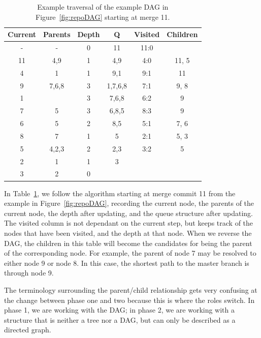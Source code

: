 \documentclass[draft]{IEEEtran}
\begin{document}
\begin{table}[htpb]
  \centering
  \caption{Example traversal of the example DAG in
    Figure~\ref{fig:repoDAG} starting at merge 11.}
  \label{tab:ex_traversal}
  \begin{tabular}{cccc|cc}
    \toprule
    Current & Parents & Depth & Q       & Visited & Children\\\midrule
    -       & -       & 0     & 11      & 11:0    & \\
    11      & 4,9     & 1     & 4,9     & 4:0     & 11, 5\\
    4       & 1       & 1     & 9,1     & 9:1     & 11\\
    9       & 7,6,8   & 3     & 1,7,6,8 & 7:1     & 9, 8\\
    1       &         & 3     & 7,6,8   & 6:2     & 9\\
    7       & 5       & 3     & 6,8,5   & 8:3     & 9\\
    6       & 5       & 2     & 8,5     & 5:1     & 7, 6\\
    8       & 7       & 1     & 5       & 2:1     & 5, 3\\
    5       & 4,2,3   & 2     & 2,3     & 3:2     & 5\\
    2       & 1       & 1     & 3       &         & \\
    3       & 2       & 0     &         &         & \\
    \bottomrule
  \end{tabular}
\end{table}

In Table~\ref{tab:ex_traversal}, we follow the algorithm starting at
merge commit 11 from the example in Figure~\ref{fig:repoDAG}, recording
the current node, the parents of the current node, the depth after
updating, and the queue structure after updating. The visited column is
not dependant on the current step, but keeps track of the nodes that
have been visited, and the depth at that node. When we reverse the DAG,
the children in this table will become the candidates for being the
parent of the corresponding node. For example, the parent of node 7 may
be resolved to either node 9 or node 8. In this case, the shortest path
to the master branch is through node 9.

The terminology surrounding the parent/child relationship gets very
confusing at the change between phase one and two because this is where
the roles switch. In phase 1, we are working with the DAG; in phase 2,
we are working with a structure that is neither a tree nor a DAG, but
can only be described as a directed graph.
\end{document}
